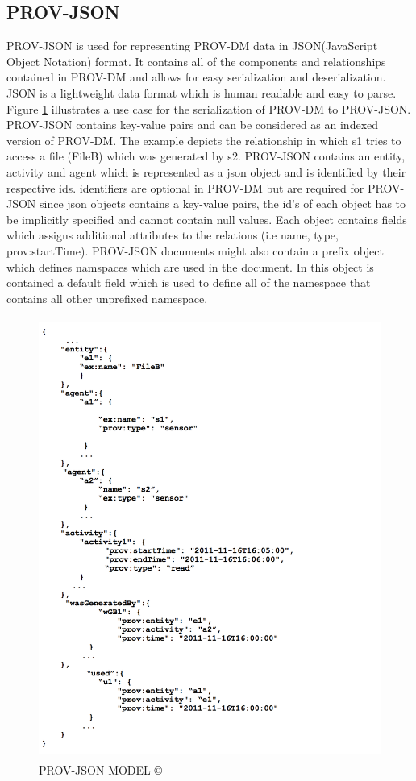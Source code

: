 \subsection{PROV-JSON}

PROV-JSON is used for representing PROV-DM data in JSON(JavaScript Object Notation) format. It contains all of the components and relationships contained in PROV-DM and allows for easy serialization and deserialization. JSON is a lightweight data format which is human readable and easy to parse. Figure \ref{provjson} illustrates a use case for the serialization of PROV-DM to PROV-JSON. PROV-JSON contains key-value pairs and can be considered as an indexed version of PROV-DM. The example depicts the relationship in which s1 tries to access a file (FileB) which was generated by s2. PROV-JSON  contains an entity, activity and agent which is represented as a json object and is identified by their respective ids.  identifiers are optional in PROV-DM but are required for PROV-JSON since json objects contains a key-value pairs, the id's of each object has to be implicitly specified and cannot contain null values. Each object contains fields which assigns additional attributes to the relations (i.e name, type, prov:startTime).  PROV-JSON documents might also contain a prefix object which defines namspaces which are used in the document. In this object is contained a default field which is used to define all of the namespace that contains all other unprefixed namespace.


\begin{figure}[h]
\begin{center}

\includegraphics[height=5.7in]{prov_json_edit.png}
\end{center}
\caption{PROV-JSON MODEL \copyright \cite{prov_json}}

\label{provjson}

\end{figure}


